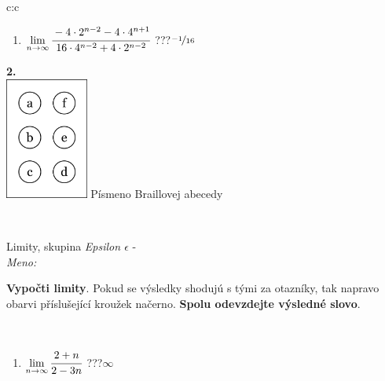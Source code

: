 \documentclass[10pt]{report}
\begin{document}
\begin{tabular}{c:c}
\begin{minipage}[c][104.5mm][t]{0.5\linewidth}
\begin{center}
\begin{minipage}{0.79\linewidth}
\begin{center}
\begin{varwidth}{\linewidth}
\begin{enumerate}
\item $\lim\limits_{n\to\infty}\cfrac{-4\cdot 2^{n-2}-4\cdot 4^{n+1}}{16\cdot 4^{n-2}+4\cdot 2^{n-2}}$\quad \dotfill\; ???\;\dotfill \quad $\nicefrac{-1}{16}$
\end{enumerate}
\end{varwidth}
\end{center}
\end{minipage}
\begin{minipage}{0.20\linewidth}
\begin{center}
{\Huge\bfseries 2.} \\[2mm]
\includegraphics[height=40mm]{../images/braille.png}
{\small Písmeno Braillovej abecedy}
\end{center}
\end{minipage}
\end{center}
\end{minipage}
\\ \hdashline
\begin{minipage}[c][104.5mm][t]{0.5\linewidth}
\begin{center}
\vspace{7mm}
{\huge Limity, skupina \textit{Epsilon $\epsilon$} -}\\[5mm]
\textit{Meno:}\phantom{xxxxxxxxxxxxxxxxxxxxxxxxxxxxxxxxxxxxxxxxxxxxxxxxxxxxxxxxxxxxxxxxx}\\[5mm]
\begin{minipage}{0.95\linewidth}
\begin{center}
\textbf{Vypočti limity}. Pokud se výsledky shodujú s tými za otazníky, tak napravo\\obarvi příslušející kroužek načerno. \textbf{Spolu odevzdejte výsledné slovo}.
\end{center}
\end{minipage}
\\[1mm]
\begin{minipage}{0.79\linewidth}
\begin{center}
\begin{varwidth}{\linewidth}
\begin{enumerate}
\normalsize
\item $\lim\limits_{n\to\infty}\cfrac{2+n}{2-3n}$\quad \dotfill\; ???\;\dotfill \quad $\infty$

\end{enumerate}
\end{varwidth}
\end{center}
\end{minipage}
\end{center}
\end{minipage}
\end{tabular}
\end{document}
